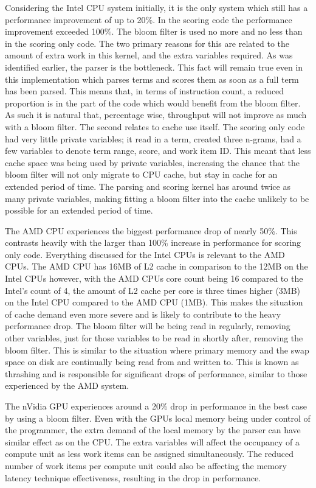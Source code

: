 Considering the Intel CPU system initially, it is the only system which still
has a performance improvement of up to 20\%. In the scoring code the performance
improvement exceeded 100\%. The bloom filter is used no more and no less than in
the scoring only code. The two primary reasons for this are related to the
amount of extra work in this kernel, and the extra variables required. As was
identified earlier, the parser is the bottleneck. This fact will remain true
even in this implementation which parses terms and scores them as soon as a full
term has been parsed. This means that, in terms of instruction count, a reduced
proportion is in the part of the code which would benefit from the bloom filter.
As such it is natural that, percentage wise, throughput will not improve as much
with a bloom filter. The second relates to cache use itself. The scoring only
code had very little private variables; it read in a term, created three
n-grams, had a few variables to denote term range, score, and work item ID. This
meant that less cache space was being used by private variables, increasing the
chance that the bloom filter will not only migrate to CPU cache, but stay in
cache for an extended period of time. The parsing and scoring kernel has around
twice as many private variables, making fitting a bloom filter into the cache
unlikely to be possible for an extended period of time.

The AMD CPU experiences the biggest performance drop of nearly 50\%. This
contrasts heavily with the larger than 100\% increase in performance for scoring
only code. Everything discussed for the Intel CPUs is relevant to the AMD CPUs.
The AMD CPU has 16MB of L2 cache in comparison to the 12MB on the Intel CPUs
however, with the AMD CPUs core count being 16 compared to the Intel's count of
4, the amount of L2 cache per core is three times higher (3MB) on the Intel CPU
compared to the AMD CPU (1MB). This makes the situation of cache demand even
more severe and is likely to contribute to the heavy performance drop. The bloom
filter will be being read in regularly, removing other variables, just for those
variables to be read in shortly after, removing the bloom filter. This is
similar to the situation where primary memory and the swap space on disk are
continually being read from and written to. This is known as thrashing and is
responsible for significant drops of performance, similar to those experienced
by the AMD system.

The nVidia GPU experiences around a 20\% drop in performance in the best case by
using a bloom filter. Even with the GPUs local memory being under control of the
programmer, the extra demand of the local memory by the parser can have similar
effect as on the CPU. The extra variables will affect the occupancy of a compute
unit as less work items can be assigned simultaneously. The reduced number of
work items per compute unit could also be affecting the memory latency technique
effectiveness, resulting in the drop in performance.

